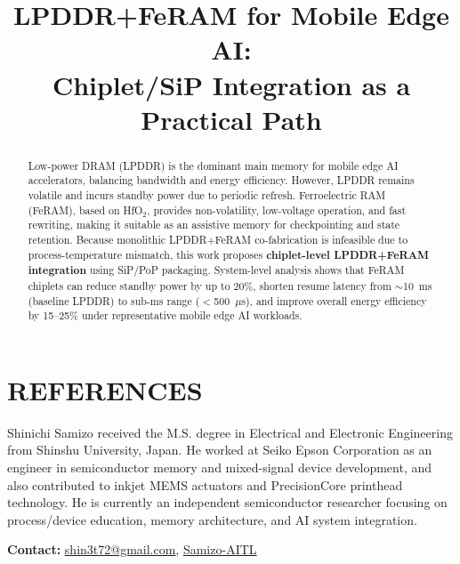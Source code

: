 \documentclass[10pt,conference]{IEEEtran}
\title{LPDDR+FeRAM for Mobile Edge AI:\\
Chiplet/SiP Integration as a Practical Path}
\author{%
  \IEEEauthorblockN{Shinichi Samizo}%
  \IEEEauthorblockA{Independent Semiconductor Researcher\\
  Former Engineer, Seiko Epson Corporation\\
  Email: \href{mailto:shin3t72@gmail.com}{shin3t72@gmail.com}\\
  GitHub: \href{https://github.com/Samizo-AITL}{Samizo-AITL}}%
}
\begin{document}
\maketitle

\begin{abstract}
Low-power DRAM (LPDDR) is the dominant main memory for mobile edge AI accelerators, balancing bandwidth and energy efficiency.
However, LPDDR remains volatile and incurs standby power due to periodic refresh.
Ferroelectric RAM (FeRAM), based on HfO$_2$, provides non-volatility, low-voltage operation, and fast rewriting, making it suitable as an assistive memory for checkpointing and state retention.
Because monolithic LPDDR+FeRAM co-fabrication is infeasible due to process-temperature mismatch, this work proposes \textbf{chiplet-level LPDDR+FeRAM integration} using SiP/PoP packaging.
System-level analysis shows that FeRAM chiplets can reduce standby power by up to 20\%, shorten resume latency from $\sim$10~ms (baseline LPDDR) to sub-ms range ($<$500~$\mu$s), and improve overall energy efficiency by 15--25\% under representative mobile edge AI workloads.
\end{abstract}







\section*{REFERENCES}
\vspace{1ex} %
\balance



\vspace{-0.5\baselineskip}
\begingroup\small
\begin{IEEEbiographynophoto}{Shinichi Samizo}
received the M.S. degree in Electrical and Electronic Engineering from Shinshu University, Japan.
He worked at Seiko Epson Corporation as an engineer in semiconductor memory and mixed-signal device development, and also contributed to inkjet MEMS actuators and PrecisionCore printhead technology.
He is currently an independent semiconductor researcher focusing on process/device education, memory architecture, and AI system integration.

\textbf{Contact:} \href{mailto:shin3t72@gmail.com}{shin3t72@gmail.com},
\href{https://github.com/Samizo-AITL}{Samizo-AITL}
\end{IEEEbiographynophoto}
\endgroup
\end{document}
